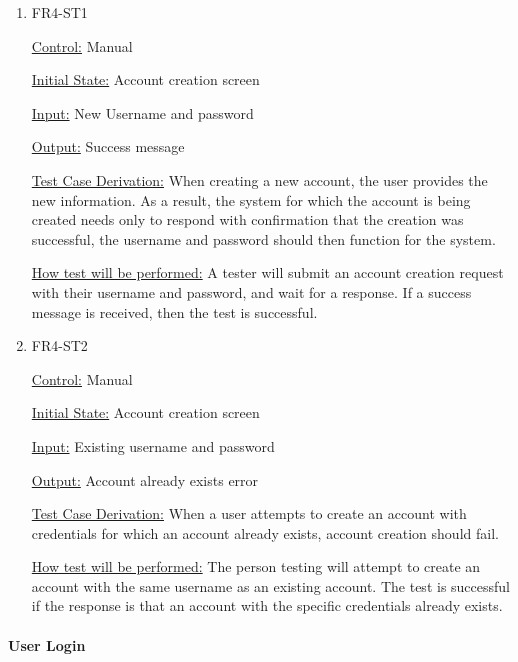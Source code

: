 \documentclass[12pt, titlepage]{article}
\begin{document}
\begin{enumerate}

\item{FR4-ST1\\}

\underline{Control:} Manual

\underline{Initial State:} Account creation screen

\underline{Input:} New Username and password

\underline{Output:} Success message

\underline{Test Case Derivation:} When creating a new account, the user provides the new information. As a result, the system for which the account is being created needs only to respond with confirmation that the creation was successful, the username and password should then function for the system.

\underline{How test will be performed:} A tester will submit an account creation request with their username and password, and wait for a response. If a success message is received, then the test is successful.
					
\item{FR4-ST2\\}

\underline{Control:} Manual

\underline{Initial State:} Account creation screen

\underline{Input:} Existing username and password

\underline{Output:} Account already exists error

\underline{Test Case Derivation:} When a user attempts to create an account with credentials for which an account already exists, account creation should fail. 

\underline{How test will be performed:} The person testing will attempt to create an account with the same username as an existing account. The test is successful if the response is that an account with the specific credentials already exists.

\end{enumerate}

\paragraph{User Login}
\end{document}
